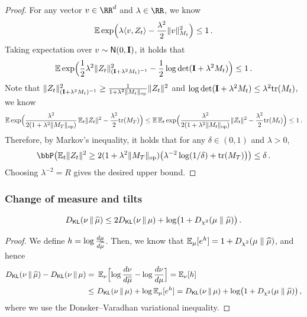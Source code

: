 \begin{proof}
For any vector $v\in\RR^d$ and $\lambda\in\RR$, we know
\begin{align*}
    \En \exp\prn[\Big]{ \lambda \tri{v, Z_t}-\frac{\lambda^2}{2} \nrm{v}^2_{M_t} }\leq 1\,.
\end{align*}
Taking expectation over $v\sim \normal{0,\Id}$, it holds that
\begin{align*}
    \En \exp\prn[\Big]{ \frac{1}{2}\lambda^2 \nrm{Z_t}^2_{(\Id+\lambda^2 M_t)^{-1}}-\frac12\log\det(\Id+\lambda^2 M_t) }\leq 1\,.
\end{align*}
Note that $\nrm{Z_t}^2_{(\Id+\lambda^2 M_t)^{-1}}\geq \frac{1}{1+\lambda^2\nrmop{M_t}}\nrm{Z_t}^2$ and $\log\det(\Id+\lambda^2 M_t)\leq \lambda^2 \tr(M_t)$, we know
\begin{align*}
    \En \exp\prn[\Big]{ \frac{\lambda^2}{2(1+\lambda^2\nrmop{M_T})}\En_t\nrm{Z_t}^2-\frac{\lambda^2}2\tr(M_T) }
    \leq \En \En_{t}\exp\prn[\Big]{ \frac{\lambda^2}{2(1+\lambda^2\nrmop{M_t})}\nrm{Z_t}^2-\frac{\lambda^2}2\tr(M_t) }\leq 1\,.
\end{align*}
Therefore, by Markov's inequality, it holds that for any $\delta\in(0,1)$ and $\lambda>0$,
\begin{align*}
    \bbP\prn*{ \En_t\nrm{Z_t}^2\geq 2(1+\lambda^2\nrmop{M_T})\prn*{\lambda^{-2}\log(1/\delta)+\tr(M_T)} }\leq \delta\,.
\end{align*}
Choosing $\lambda^{-2}=R$ gives the desired upper bound.
\end{proof}



\subsubsection{Change of measure and tilts}

\begin{lemma}\label{lem:KL-triangle}

\begin{align*}
    \Dkl{\nu}{\muhat}\leq 2\Dkl{\nu}{\mu}+\log\prn*{1+\Dchis{\mu}{\muhat}}\,.
\end{align*}
\end{lemma}
\begin{proof}
We define $h=\log \frac{d\mu}{d\muhat}$. Then, we know that $\En_{\mu}[e^h]=1+\Dchis{\mu}{\muhat}$, and hence
\begin{align*}
    \Dkl{\nu}{\muhat}-\Dkl{\nu}{\mu}=&~\En_{\nu}\brk[\Big]{\log \frac{d\nu}{d\muhat}-\log \frac{d\nu}{d\mu}} 
    = \En_\nu[h] \\
    \leq&~ \Dkl{\nu}{\mu}+\log \En_{\mu}[e^{h}]
    =\Dkl{\nu}{\mu}+\log\prn*{1+\Dchis{\mu}{\muhat}}\,,
\end{align*}
where we use the Donsker--Varadhan variational inequality.
\end{proof}

